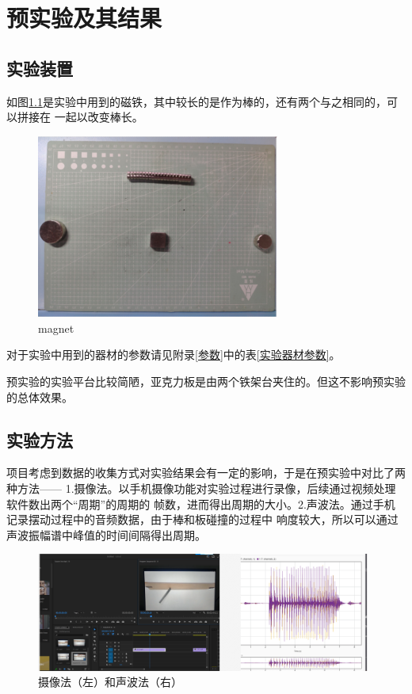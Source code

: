 \documentclass[AutoFakeBold]{LZUThesis}
\begin{document}
\chapter{预实验及其结果}
\section{实验装置}
如图\ref{magnet}是实验中用到的磁铁，其中较长的是作为棒的，还有两个与之相同的，可以拼接在
一起以改变棒长。
\begin{figure}[H]
    \centering
    \includegraphics[width=8cm]{figures/magnet.png}
    \caption{magnet}
    \label{magnet}
\end{figure}

对于实验中用到的器材的参数请见附录\ref{参数}中的表\ref{实验器材参数}。

预实验的实验平台比较简陋，亚克力板是由两个铁架台夹住的。但这不影响预实验的总体效果。

\section{实验方法}
项目考虑到数据的收集方式对实验结果会有一定的影响，于是在预实验中对比了两种方法——
1.摄像法。以手机摄像功能对实验过程进行录像，后续通过视频处理软件数出两个“周期”的周期的
帧数，进而得出周期的大小。2.声波法。通过手机记录摆动过程中的音频数据，由于棒和板碰撞的过程中
响度较大，所以可以通过声波振幅谱中峰值的时间间隔得出周期。
\begin{figure}[H]
    \centering
    \includegraphics[width=11cm]{figures/ways.png}
    \caption{摄像法（左）和声波法（右）}
    \label{ways}
\end{figure}
\end{document}
